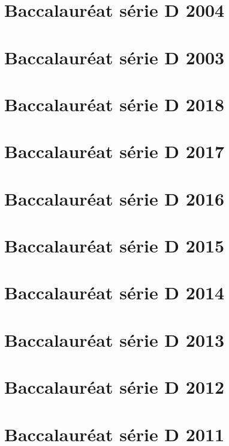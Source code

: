 \section{Baccalauréat série D 2004}

\newpage
\section{Baccalauréat série D 2003}

\newpage
\begin{corrige}

\section{Baccalauréat série D 2018}
{\color{loko2}}

\section{Baccalauréat série D 2017}
{\color{loko2}}

\section{Baccalauréat série D 2016}
{\color{loko2}}

\section{Baccalauréat série D 2015}
{\color{loko2}}

\section{Baccalauréat série D 2014}
{\color{loko2}}

\section{Baccalauréat série D 2013}
{\color{loko2}}

\section{Baccalauréat série D 2012}
{\color{loko2}}

\section{Baccalauréat série D 2011}
{\color{loko2}}


\end{corrige}
